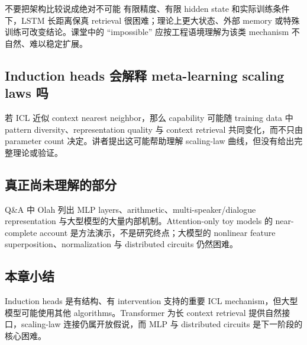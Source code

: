 
\begin{knowledgebox}{不要把架构比较说成绝对不可能}
有限精度、有限 hidden state 和实际训练条件下，LSTM 长距离保真 retrieval 很困难；理论上更大状态、外部 memory 或特殊训练可改变结论。课堂中的 “impossible” 应按工程语境理解为该类 mechanism 不自然、难以稳定扩展。
\end{knowledgebox}

\subsection{Induction heads 会解释 meta-learning scaling laws 吗}

若 ICL 近似 context nearest neighbor，那么 capability 可能随 training data 中 pattern diversity、representation quality 与 context retrieval 共同变化，而不只由 parameter count 决定。讲者提出这可能帮助理解 scaling-law 曲线，但没有给出完整理论或验证。



\subsection{真正尚未理解的部分}

Q\&A 中 Olah 列出 MLP layers、arithmetic、multi-speaker/dialogue representation 与大型模型的大量内部机制。Attention-only toy models 的 near-complete account 是方法演示，不是研究终点；大模型的 nonlinear feature superposition、normalization 与 distributed circuits 仍然困难。


\subsection{本章小结}

Induction heads 是有结构、有 intervention 支持的重要 ICL mechanism，但大型模型可能使用其他 algorithms。Transformer 为长 context retrieval 提供自然接口，scaling-law 连接仍属开放假说，而 MLP 与 distributed circuits 是下一阶段的核心困难。

